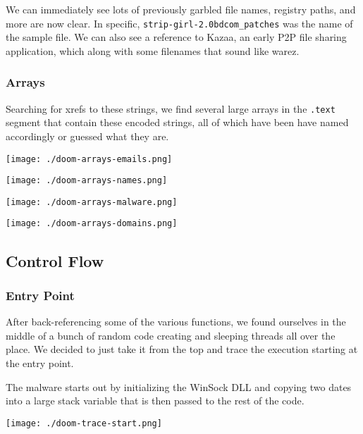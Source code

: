 \documentclass[11pt]{article}
\begin{document}
We can immediately see lots of previously garbled file names, registry
paths, and more are now clear. In specific,
\texttt{strip-girl-2.0bdcom\_patches} was the name of the sample file. We can
also see a reference to Kazaa, an early P2P file sharing application,
which along with some filenames that sound like warez.
\subsubsection{Arrays}
\label{sec:orgad915ec}
Searching for xrefs to these strings, we find several large arrays in
the \texttt{.text} segment that contain these encoded strings, all of which
have been have named accordingly or guessed what they are.

\begin{center}
\texttt{[image: ./doom-arrays-emails.png]}
\end{center}

\begin{center}
\texttt{[image: ./doom-arrays-names.png]}
\end{center}

\begin{center}
\texttt{[image: ./doom-arrays-malware.png]}
\end{center}

\begin{center}
\texttt{[image: ./doom-arrays-domains.png]}
\end{center}
\subsection{Control Flow}
\label{sec:org6648806}
\subsubsection{Entry Point}
\label{sec:org9b70ac0}
After back-referencing some of the various functions, we found
ourselves in the middle of a bunch of random code creating and
sleeping threads all over the place. We decided to just take it from
the top and trace the execution starting at the entry point.

The malware starts out by initializing the WinSock DLL and copying two
dates into a large stack variable that is then passed to the rest of
the code.

\begin{center}
\texttt{[image: ./doom-trace-start.png]}
\end{center}
\end{document}
